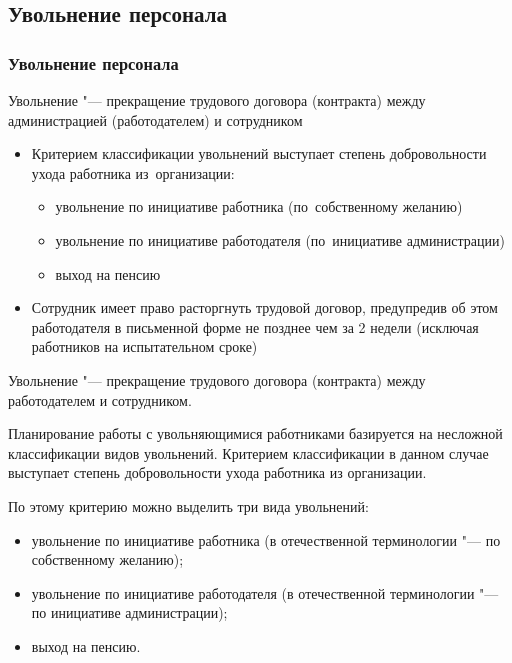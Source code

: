 \documentclass{../industrial-development}
\begin{document}
	\subsection{Увольнение персонала}
	\begin{frame} \frametitle{Увольнение персонала}
		
		\alert{Увольнение} "--- прекращение трудового договора (контракта) между администрацией (работодателем) и сотрудником 
		
		\begin{itemize}
			\item Критерием классификации увольнений выступает степень добровольности ухода работника из~организации:
			\begin{itemize}
				\item увольнение по инициативе работника (по~собственному желанию)
				\item увольнение по инициативе работодателя (по~инициативе администрации)
				\item выход на пенсию
			\end{itemize}
			\item Сотрудник имеет право расторгнуть трудовой договор, предупредив об этом работодателя в письменной форме не позднее чем за 2 недели (исключая работников на испытательном сроке)
			
		\end{itemize}
		
	\end{frame}
	
	\lecturenotes
	
	Увольнение "--- прекращение трудового договора (контракта) между работодателем и сотрудником.
	
	Планирование работы с увольняющимися работниками базируется на несложной классификации видов увольнений. Критерием классификации в данном случае выступает степень добровольности ухода работника из организации.
	
	По этому критерию можно выделить три вида увольнений:
	\begin{itemize}
		\item увольнение по инициативе работника (в отечественной терминологии "--- по собственному желанию);
		\item увольнение по инициативе работодателя (в отечественной терминологии "--- по инициативе администрации);
		\item выход на пенсию.
	\end{itemize}
	
\end{document}
